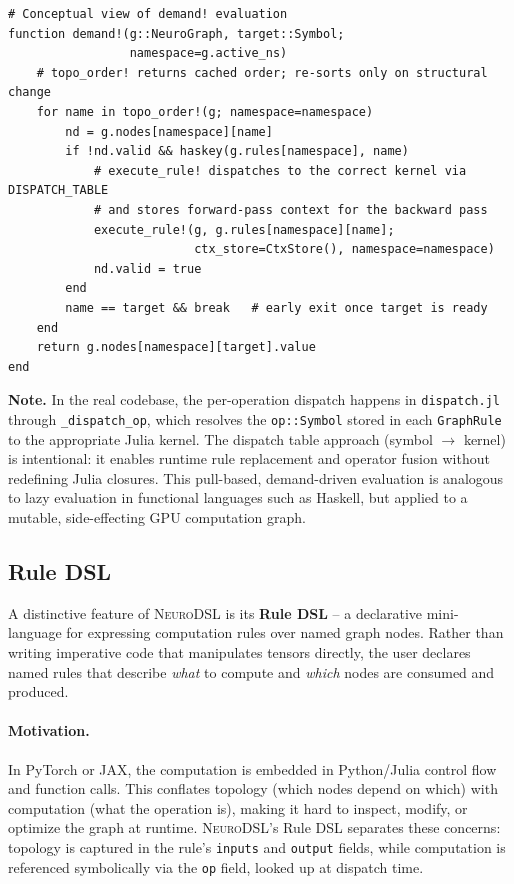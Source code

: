 \documentclass{article}
\begin{document}
\begin{lstlisting}[caption={Lazy demand evaluation (simplified from graph\_api.jl + dispatch.jl)}, label={lst:demand}]
# Conceptual view of demand! evaluation
function demand!(g::NeuroGraph, target::Symbol;
                 namespace=g.active_ns)
    # topo_order! returns cached order; re-sorts only on structural change
    for name in topo_order!(g; namespace=namespace)
        nd = g.nodes[namespace][name]
        if !nd.valid && haskey(g.rules[namespace], name)
            # execute_rule! dispatches to the correct kernel via DISPATCH_TABLE
            # and stores forward-pass context for the backward pass
            execute_rule!(g, g.rules[namespace][name];
                          ctx_store=CtxStore(), namespace=namespace)
            nd.valid = true
        end
        name == target && break   # early exit once target is ready
    end
    return g.nodes[namespace][target].value
end
\end{lstlisting}

\noindent\textbf{Note.} In the real codebase, the per-operation dispatch happens in \texttt{dispatch.jl} through \texttt{\_dispatch\_op}, which resolves the \texttt{op::Symbol} stored in each \texttt{GraphRule} to the appropriate Julia kernel. The dispatch table approach (symbol $\to$ kernel) is intentional: it enables runtime rule replacement and operator fusion without redefining Julia closures. This pull-based, demand-driven evaluation is analogous to lazy evaluation in functional languages such as Haskell, but applied to a mutable, side-effecting GPU computation graph.

\subsection{Rule DSL}
\label{sec:rule_dsl}
A distinctive feature of \textsc{NeuroDSL} is its \textbf{Rule DSL} -- a declarative mini-language for expressing computation rules over named graph nodes. Rather than writing imperative code that manipulates tensors directly, the user declares named rules that describe \emph{what} to compute and \emph{which} nodes are consumed and produced.

\paragraph{Motivation.} In PyTorch or JAX, the computation is embedded in Python/Julia control flow and function calls. This conflates topology (which nodes depend on which) with computation (what the operation is), making it hard to inspect, modify, or optimize the graph at runtime. \textsc{NeuroDSL}'s Rule DSL separates these concerns: topology is captured in the rule's \texttt{inputs} and \texttt{output} fields, while computation is referenced symbolically via the \texttt{op} field, looked up at dispatch time.
\end{document}
